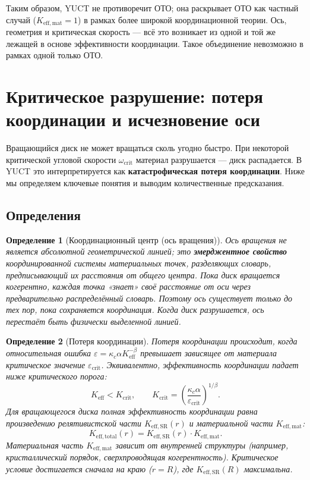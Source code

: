 \documentclass[12pt,a4paper]{article}
\newtheorem{definition}{Определение}[section]
\newcommand{\kappac}{\kappa_c}
\newcommand{\betaf}{\beta}
\newcommand{\Keff}{K_{\mathrm{eff}}}
\newcommand{\Keffmat}{K_{\mathrm{eff,mat}}}
\newcommand{\Kefftot}{K_{\mathrm{eff,total}}}
\newcommand{\KeffSR}{K_{\mathrm{eff,SR}}}
\newcommand{\Kcrit}{K_{\mathrm{crit}}}
\begin{document}
	Таким образом, YUCT не противоречит ОТО; она раскрывает ОТО как частный случай (\(K_{\mathrm{eff,mat}}=1\)) в рамках более широкой координационной теории. Ось, геометрия и критическая скорость — всё это возникает из одной и той же лежащей в основе эффективности координации. Такое объединение невозможно в рамках одной только ОТО.
	
	\section{Критическое разрушение: потеря координации и исчезновение оси}
	\label{sec:critical-disruption}
	
	Вращающийся диск не может вращаться сколь угодно быстро. При некоторой критической угловой скорости \(\omega_{\text{crit}}\) материал разрушается — диск распадается. В YUCT это интерпретируется как \textbf{катастрофическая потеря координации}. Ниже мы определяем ключевые понятия и выводим количественные предсказания.
	
	\subsection{Определения}
	
	\begin{definition}[Координационный центр (ось вращения)]
		Ось вращения не является абсолютной геометрической линией; это \textbf{эмерджентное свойство} координированной системы материальных точек, разделяющих словарь, предписывающий их расстояния от общего центра. Пока диск вращается когерентно, каждая точка «знает» своё расстояние от оси через предварительно распределённый словарь. Поэтому ось существует только до тех пор, пока сохраняется координация. Когда диск разрушается, ось перестаёт быть физически выделенной линией.
	\end{definition}
	
	\begin{definition}[Потеря координации]
		Потеря координации происходит, когда относительная ошибка \(\varepsilon = \kappac \alpha K_{\mathrm{eff}}^{-\betaf}\) превышает зависящее от материала критическое значение \(\varepsilon_{\text{crit}}\). Эквивалентно, эффективность координации падает ниже критического порога:
		\[
		\Keff < \Kcrit, \qquad \Kcrit = \left( \frac{\kappac \alpha}{\varepsilon_{\text{crit}}} \right)^{1/\betaf}.
		\]
		Для вращающегося диска полная эффективность координации равна произведению релятивистской части \(K_{\mathrm{eff,SR}}(r)\) и материальной части \(K_{\mathrm{eff,mat}}\):
		\[
		\Kefftot(r) = \KeffSR(r) \cdot \Keffmat.
		\]
		Материальная часть \(K_{\mathrm{eff,mat}}\) зависит от внутренней структуры (например, кристаллический порядок, сверхпроводящая когерентность). Критическое условие достигается сначала на краю (\(r = R\)), где \(\KeffSR(R)\) максимальна.
	\end{definition}
	
\end{document}
